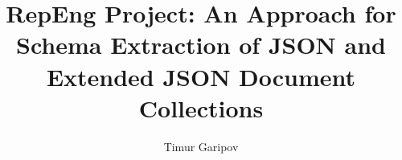 \documentclass[sigconf, nonacm]{acmart}
\newcommand\vldbdoi{XX.XX/XXX.XX}
\newcommand\vldbpages{XXX-XXX}
\newcommand\vldbvolume{14}
\newcommand\vldbissue{1}
\newcommand\vldbyear{2020}
\newcommand\vldbauthors{\authors}
\newcommand\vldbtitle{\shorttitle}
\newcommand\vldbpagestyle{plain}
\begin{document}
\title{RepEng Project: An Approach for Schema Extraction of JSON and Extended JSON Document Collections}

\author{Timur Garipov}


\maketitle

\end{document}
